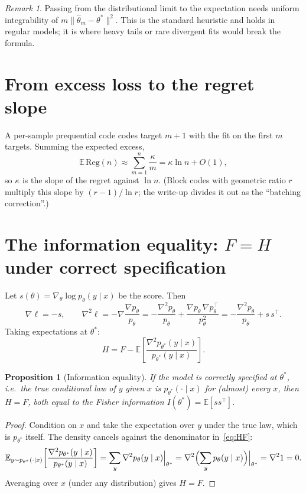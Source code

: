 \documentclass[11pt]{article}
\newtheorem{proposition}{Proposition}
\theoremstyle{remark}
\newtheorem*{remark}{Remark}
\newcommand{\E}{\mathbb{E}}
\newcommand{\ts}{\theta^*}
\newcommand{\hth}{\hat\theta_m}
\begin{document}
\begin{remark}
Passing from the distributional limit to the expectation needs uniform integrability of $m\|\hth-\ts\|^2$. This is the standard heuristic and holds in regular models; it is where heavy tails or rare divergent fits would break the formula.
\end{remark}

\section{From excess loss to the regret slope}
\label{sec:sum}

A per-sample prequential code codes target $m+1$ with the fit on the first $m$ targets. Summing the expected excess,
\[
\E\,\mathrm{Reg}(n)\approx\sum_{m=1}^{n}\frac{\kappa}{m}=\kappa\ln n+O(1),
\]
so $\kappa$ is the slope of the regret against $\ln n$. (Block codes with geometric ratio $r$ multiply this slope by $(r-1)/\ln r$; the write-up divides it out as the ``batching correction''.)

\section{The information equality: \texorpdfstring{$F=H$}{F=H} under correct specification}
\label{sec:infoeq}

Let $s(\theta)=\nabla_\theta\log p_\theta(y\mid x)$ be the score. Then
\[
\nabla\ell=-s,\qquad
\nabla^2\ell=-\nabla\frac{\nabla p_\theta}{p_\theta}=-\frac{\nabla^2p_\theta}{p_\theta}+\frac{\nabla p_\theta\,\nabla p_\theta^\top}{p_\theta^2}
=-\frac{\nabla^2p_\theta}{p_\theta}+s\,s^\top .
\]
Taking expectations at $\ts$:
\begin{equation}
H=F-\E\!\left[\frac{\nabla^2p_{\ts}(y\mid x)}{p_{\ts}(y\mid x)}\right].
\label{eq:HF}
\end{equation}

\begin{proposition}[Information equality]
If the model is correctly specified at $\ts$, i.e.\ the true conditional law of $y$ given $x$ is $p_{\ts}(\cdot\mid x)$ for (almost) every $x$, then $H=F$, both equal to the Fisher information $I(\ts)=\E[s s^\top]$.
\end{proposition}
\begin{proof}
Condition on $x$ and take the expectation over $y$ under the true law, which is $p_{\ts}$ itself. The density cancels against the denominator in~\eqref{eq:HF}:
\[
\E_{y\sim p_{\ts}(\cdot\mid x)}\!\left[\frac{\nabla^2p_{\ts}(y\mid x)}{p_{\ts}(y\mid x)}\right]
=\sum_y\nabla^2p_\theta(y\mid x)\Big|_{\ts}
=\nabla^2\Bigl(\sum_yp_\theta(y\mid x)\Bigr)\Big|_{\ts}
=\nabla^2 1=0 .
\]
Averaging over $x$ (under any distribution) gives $H=F$.
\end{proof}
\end{document}
